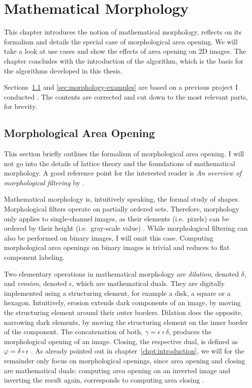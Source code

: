 \chapter{Mathematical Morphology}
\label{chpt:morphology}

This chapter introduces the notion of mathematical morphology, reflects on its
formalism and details the special case of morphological area opening. We will
take a look at use cases and show the effects of area opening on 2D images. The
chapter concludes with the introduction of the algorithm, which is the basis for
the algorithms developed in this thesis.

Sections~\ref{sec:morphology-area-opening} and \ref{sec:morphology-examples} are
based on a previous project I conducted \cite{Biermann2013Morphological}. The
contents are corrected and cut down to the most relevant parts, for brevity.

\section{Morphological Area Opening}
\label{sec:morphology-area-opening}

This section briefly outlines the formalism of morphological area opening. I
will not go into the details of lattice theory and the foundations of
mathematical morphology. A good reference point for the interested reader is
\emph{An overview of morphological filtering} by \citet{Serra1992Overview}.

Mathematical morphology is, intuitively speaking, the formal study of
shapes. Morphological filters operate on partially ordered sets. Therefore,
morphology only applies to single-channel images, as their elements
(i.e.~pixels) can be ordered by their height (i.e.~gray-scale value)
\cite{Serra1992Overview}. While morphological filtering can also be performed on
binary images, I will omit this case. Computing morphological area openings on
binary images is trivial and reduces to flat component labeling.

Two elementary operations in mathematical morphology are \emph{dilation},
denoted $\delta$, and \emph{erosion}, denoted $\epsilon$, which are mathematical
duals. They are digitally implemented using a structuring element, for example a
disk, a square or a hexagon. Intuitively, erosion extends dark components of an
image, by moving the structuring element around their outer borders. Dilation
does the opposite, narrowing dark elements, by moving the structuring element on
the inner border of the component. The concatenation of both, $\gamma = \epsilon
\circ \delta$, produces the morphological opening of an image. Closing, the
respective dual, is defined as $\varphi = \delta \circ \epsilon$
\cite{Serra1992Overview}. As already pointed out in
chapter~\ref{chpt:introduction}, we will for the remainder only focus on
morphological openings, since area opening and closing are mathematical duals:
computing area opening on an inverted image and inverting the result again,
corresponds to computing area closing \cite{Wilkinson2000Fast}.

